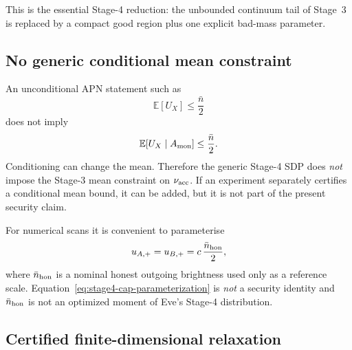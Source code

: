 \documentclass[11pt]{article}
\theoremstyle{remark}
\begin{document}
This is the essential Stage-4 reduction: the unbounded continuum tail of
Stage~3 is replaced by a compact good region plus one explicit bad-mass
parameter.

\subsection{No generic conditional mean constraint}

An unconditional APN statement such as
\[
    \mathbb E[U_X]\le\frac{\bar n}{2}
\]
does not imply
\[
    \mathbb E[U_X\mid A_{\rm mon}]
    \le\frac{\bar n}{2}.
\]
Conditioning can change the mean.  Therefore the generic Stage-4 SDP does
\emph{not} impose the Stage-3 mean constraint on \(\nu_{\rm acc}\).  If an
experiment separately certifies a conditional mean bound, it can be added,
but it is not part of the present security claim.

For numerical scans it is convenient to parameterise
\begin{equation}
    u_{A,+}=u_{B,+}
    =
    c\,\frac{\bar n_{\rm hon}}{2},
    \label{eq:stage4-cap-parameterization}
\end{equation}
where \(\bar n_{\rm hon}\) is a nominal honest outgoing brightness used only
as a reference scale.  Equation~\eqref{eq:stage4-cap-parameterization} is
\emph{not} a security identity and \(\bar n_{\rm hon}\) is not an optimized
moment of Eve's Stage-4 distribution.

\subsection{Certified finite-dimensional relaxation}
\end{document}
